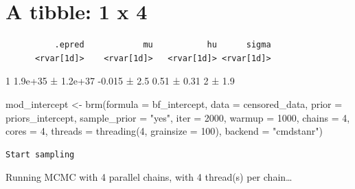\documentclass[
]{article}
\newenvironment{Shaded}{\begin{snugshade}}{\end{snugshade}}
\newcommand{\AttributeTok}[1]{\textcolor[rgb]{0.40,0.45,0.13}{#1}}
\newcommand{\DecValTok}[1]{\textcolor[rgb]{0.68,0.00,0.00}{#1}}
\newcommand{\FunctionTok}[1]{\textcolor[rgb]{0.28,0.35,0.67}{#1}}
\newcommand{\NormalTok}[1]{\textcolor[rgb]{0.00,0.23,0.31}{#1}}
\newcommand{\OtherTok}[1]{\textcolor[rgb]{0.00,0.23,0.31}{#1}}
\newcommand{\StringTok}[1]{\textcolor[rgb]{0.13,0.47,0.30}{#1}}
\begin{document}
\section{A tibble: 1 x 4}\label{a-tibble-1-x-4}

\begin{verbatim}
          .epred            mu           hu      sigma
      <rvar[1d]>    <rvar[1d]>   <rvar[1d]> <rvar[1d]>
\end{verbatim}

1 1.9e+35 ± 1.2e+37 -0.015 ± 2.5 0.51 ± 0.31 2 ± 1.9

\begin{Shaded}
\begin{Highlighting}[]
\NormalTok{mod\_intercept }\OtherTok{\textless{}{-}} \FunctionTok{brm}\NormalTok{(}\AttributeTok{formula =}\NormalTok{ bf\_intercept,}
                 \AttributeTok{data =}\NormalTok{ censored\_data,}
                 \AttributeTok{prior =}\NormalTok{ priors\_intercept,}
                 \AttributeTok{sample\_prior =} \StringTok{"yes"}\NormalTok{,}
                 \AttributeTok{iter =} \DecValTok{2000}\NormalTok{, }\AttributeTok{warmup =} \DecValTok{1000}\NormalTok{, }\AttributeTok{chains =} \DecValTok{4}\NormalTok{, }\AttributeTok{cores =} \DecValTok{4}\NormalTok{,}
                 \AttributeTok{threads =} \FunctionTok{threading}\NormalTok{(}\DecValTok{4}\NormalTok{, }\AttributeTok{grainsize =} \DecValTok{100}\NormalTok{),}
                 \AttributeTok{backend =} \StringTok{"cmdstanr"}\NormalTok{)}
\end{Highlighting}
\end{Shaded}

\begin{verbatim}
Start sampling
\end{verbatim}

Running MCMC with 4 parallel chains, with 4 thread(s) per chain\ldots{}
\end{document}
